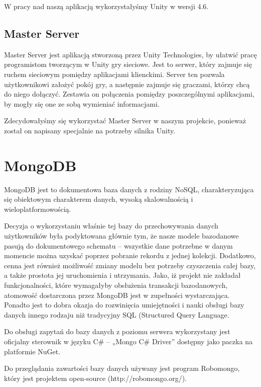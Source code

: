 W pracy nad naszą aplikacją wykorzystałyśmy Unity w wersji 4.6.

\subsection{Master Server}
Master Server jest aplikacją stworzoną przez Unity Technologies, by ułatwić pracę programistom tworzącym w Unity gry sieciowe. Jest to serwer, który zajmuje się ruchem sieciowym pomiędzy aplikacjami klienckimi. Server ten pozwala użytkownikowi założyć pokój gry, a następnie zajmuje się graczami, którzy chcą do niego dołączyć. Zestawia on połączenia pomiędzy poszczególnymi aplikacjami, by mogły się one ze sobą wymieniać informacjami.

Zdecydowałyśmy się wykorzystać Master Server w naszym projekcie, ponieważ został on napisany specjalnie na potrzeby silnika Unity.

\section{MongoDB}
MongoDB jest to dokumentowa baza danych z rodziny NoSQL, charakteryzująca się obiektowym charakterem danych, wysoką skalowalnością i wieloplatformowością.

Decyzja o wykorzystaniu właśnie tej bazy do przechowywania danych użytkowników była podyktowana głównie tym, że nasze modele bazodanowe pasują do dokumentowego schematu – wszystkie dane potrzebne w danym momencie można uzyskać poprzez pobranie rekordu z jednej kolekcji. Dodatkowo, cenna jest również możliwość zmiany modelu bez potrzeby czyszczenia całej bazy, a także prostota jej uruchomienia i utrzymania. Jako, iż projekt nie zakładał funkcjonalności, które wymagałyby obsłużenia transakcji bazodanowych, atomowość dostarczona przez MongoDB jest w zupełności wystarczająca. Ponadto jest to dobra okazja do rozwinięcia umiejętności i nauki obsługi bazy danych innego rodzaju niż tradycyjny SQL (Structured Query Language.

Do obsługi zapytań do bazy danych z poziomu serwera wykorzystany jest oficjalny sterownik w języku C{\#} – „Mongo C{\#} Driver” dostępny jako paczka na platformie NuGet.

Do przeglądania zawartości bazy danych używany jest program Robomongo, który jest projektem open-source (http://robomongo.org/).

